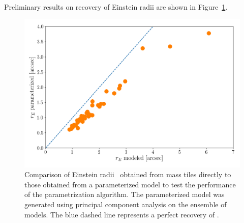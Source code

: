 Preliminary results on recovery of Einstein radii are shown in
Figure~\ref{fig:parameter}.

\begin{figure}
  \includegraphics[width=\linewidth]{img/rE_comp/rE_comp.png}
  \caption{
    Comparison of Einstein radii \ER\ obtained from mass tiles directly to 
    those obtained from a parameterized model to test the performance of the 
    parametrization algorithm.  The parameterized model was generated using 
    principal component analysis on the ensemble of models.  The blue dashed
    line represents a perfect recovery of \ER.
    }
  \label{fig:parameter}
\end{figure}



